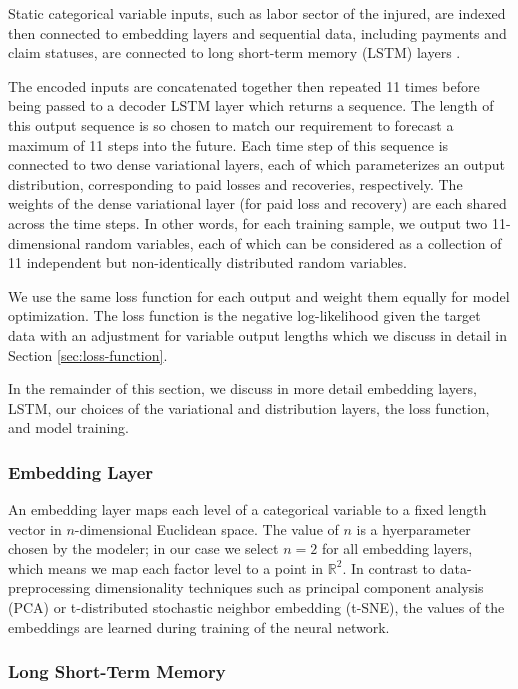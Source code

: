\documentclass{article}
\begin{document}
Static categorical variable inputs, such as labor sector of the injured, are indexed then connected to embedding layers \cite{guo2016entity} and sequential data, including payments and claim statuses, are connected to long short-term memory (LSTM) layers \cite{hochreiter1997long}.

The encoded inputs are concatenated together then repeated 11 times before being passed to a decoder LSTM layer which returns a sequence. The length of this output sequence is so chosen to match our requirement to forecast a maximum of 11 steps into the future. Each time step of this sequence is connected to two dense variational layers, each of which parameterizes an output distribution, corresponding to paid losses and recoveries, respectively. The weights of the dense variational layer (for paid loss and recovery) are each shared across the time steps. In other words, for each training sample, we output two 11-dimensional random variables, each of which can be considered as a collection of 11 independent but non-identically distributed random variables.

We use the same loss function for each output and weight them equally for model optimization. The loss function is the negative log-likelihood given the target data with an adjustment for variable output lengths which we discuss in detail in Section \ref{sec:loss-function}.

In the remainder of this section, we discuss in more detail embedding layers, LSTM, our choices of the variational and distribution layers, the loss function, and model training.

\subsubsection{Embedding Layer}

An embedding layer maps each level of a categorical variable to a fixed length vector in $n$-dimensional Euclidean space. The value of $n$ is a hyerparameter chosen by the modeler; in our case we select $n = 2$ for all embedding layers, which means we map each factor level to a point in $\mathbb{R}^2$. In contrast to data-preprocessing dimensionality techniques such as principal component analysis (PCA) or t-distributed stochastic neighbor embedding (t-SNE), the values of the embeddings are learned during training of the neural network.

\subsubsection{Long Short-Term Memory}
\end{document}
